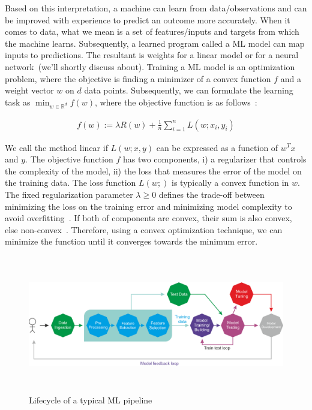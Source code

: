 \hspace*{3.5mm}Based on this interpretation, a machine can learn from data/observations and can be improved with experience to predict an outcome more accurately. When it comes to data, what we mean is a set of features/inputs and targets from which the machine learns. Subsequently, a learned program called a ML model can map inputs to predictions. The resultant is weights for a linear model or for a neural network~(we'll shortly discuss about). Training a ML model is an optimization problem, where the objective is finding a minimizer of a convex function $f$ and a weight vector $w$ on $d$ data points. Subsequently, we can formulate the learning task as $\min _{w \in \mathbb{R}^{d}} f(w)$, where the objective function is as follows~\cite{karim2018scala}:

\vspace{-4mm}
\begin{align}
    f(w):=\lambda R(w)+\frac{1}{n} \sum_{i=1}^{n} L\left(w ; x_{i}, y_{i}\right)
\end{align}

\hspace*{3.5mm} We call the method linear if $L(w;x,y)$ can be expressed as a function of $w^Tx$ and $y$. The objective function $f$ has two components, i) a regularizer that controls the complexity of the model, ii) the loss that measures the error of the model on the training data. The loss function $L(w;)$ is typically a convex function in $w$. The fixed regularization parameter $\lambda \geq 0$ defines the trade-off between minimizing the loss on the training error and minimizing model complexity to avoid overfitting~\cite{karim2018scala}. If both of components are convex, their sum is also convex, else non-convex~\cite{zaccone2018deep}. Therefore, using a convex optimization technique, we can minimize the function until it converges towards the minimum error.  %

\begin{figure}[h]
	\centering
	\includegraphics[width=0.9\linewidth,height=60mm]{images/B08452_01_02.png}
	\caption{Lifecycle of a typical ML pipeline~\cite{karimScalaML2019}} 
	\label{fig:ml_pipeline}
\end{figure}

